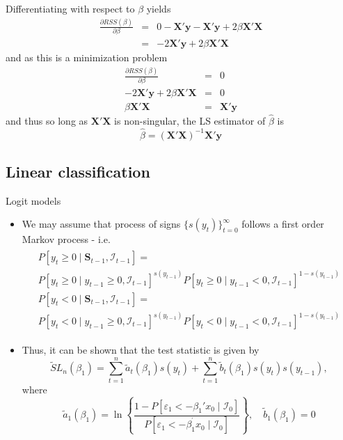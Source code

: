 \documentclass{beamer}
\begin{document}
\begin{frame}
Differentiating with respect to $\beta$ yields
\begin{eqnarray*}
\frac{\partial RSS(\beta)}{\partial \beta}&=&0-\bm{X'y}-\bm{X'y}+2\beta \bm{X'X}\\
&=&-2\bm{X'y}+2\beta \bm{X'X}
\end{eqnarray*}
and as this is a minimization problem 
\begin{eqnarray*}
\frac{\partial RSS(\beta)}{\partial \beta}&=&0\\
-2\bm{X'y}+2\beta \bm{X'X}&=&0\\
\beta \bm{X'X}&=&\bm{X'y}
\end{eqnarray*}
and thus so long as $\bm{X'X}$ is non-singular, the LS estimator of $\hat{\beta}$ is
\begin{equation}
\hat{\beta}=(\bm{X'X})^{-1}\bm{X'y}
\end{equation}
\end{frame}
\subsection{Linear classification}
\begin{frame}{Logit models}

\end{frame}

\begin{frame}
\begin{itemize}
\item{} We may assume that process of signs $\{s(y_t)\}_{t=0}^{\infty}$ follows a first order Markov process - i.e.
\begin{align*}
\begin{array}{l}
P[y_t\geq 0\mid \bm{S}_{t-1},\mathcal{I}_{t-1}]=\\
P[y_t\geq0\mid y_{t-1}\geq0,\mathcal{I}_{t-1}]^{s(y_{t-1})}P[y_t\geq0\mid y_{t-1}<0, \mathcal{I}_{t-1}]^{1-s(y_{t-1})}\\
P[y_t< 0\mid \bm{S}_{t-1},\mathcal{I}_{t-1}]=\\
P[y_t<0\mid y_{t-1}\geq0,\mathcal{I}_{t-1}]^{s(y_{t-1})}P[y_t<0\mid y_{t-1}<0,\mathcal{I}_{t-1}]^{1-s(y_{t-1})}
\end{array}
\end{align*}
\item{} Thus, it can be shown that the test statistic is given by
\begin{equation*}
\tilde{S}L_{n}(\beta _{1})=\sum\limits_{t=1}^{n}\tilde{a}_{t}(\beta _{1})%
s(y_{t})+\sum\limits_{t=1}^{n}\tilde{b}_{t}(\beta _{1})%
s(y_{t})s(y_{t-1}),
\end{equation*}%
where%
\begin{equation*}
\tilde{a}_{1}(\beta _{1})=\ln \left\{ \frac{1-P\left[ \varepsilon_{1}<-\beta
_{1}'x_{0}\mid\mathcal{I}_{0}\right] }{P\left[ \varepsilon_{1}<-\beta _{1}^{^{\prime
}}x_{0}\mid\mathcal{I}_{0}\right] }\right\} ,\quad\tilde{b}_{1}(\beta _{1})=0
\end{equation*}%
\end{itemize}
\end{frame}
\end{document}
